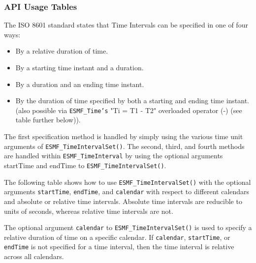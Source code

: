 
\subsubsection [API Usage Tables] {API Usage Tables}
\newpage

The ISO 8601 standard states that Time Intervals can be specified in one of four ways:

\begin{itemize}
\item By a relative duration of time. 
\item By a starting time instant and a duration. 
\item By a duration and an ending time instant. 
\item By the duration of time specified by both a starting and ending time instant. (also possible via {\tt ESMF\_Time's} "Ti = T1 - T2" overloaded operator (-) (see table further below)).
\end{itemize}

The first specification method is handled by simply using the various time unit arguments of {\tt ESMF\_TimeIntervalSet()}.  The second, third, and fourth methods are handled within {\tt ESMF\_TimeInterval} by using the optional arguments startTime and endTime to {\tt ESMF\_TimeIntervalSet()}.

The following table shows how to use {\tt ESMF\_TimeIntervalSet()} with the optional arguments {\tt startTime}, {\tt endTime}, and {\tt calendar} with respect to different calendars and absolute or relative time intervals.  Absolute time intervals are reducible to units of seconds, whereas relative time intervals are not.

The optional argument {\tt calendar} to {\tt ESMF\_TimeIntervalSet()} is used to specify a relative duration of time on a specific calendar.  If {\tt calendar}, {\tt startTime}, or {\tt endTime} is not specified for a time interval, then the time interval is relative across all calendars.

